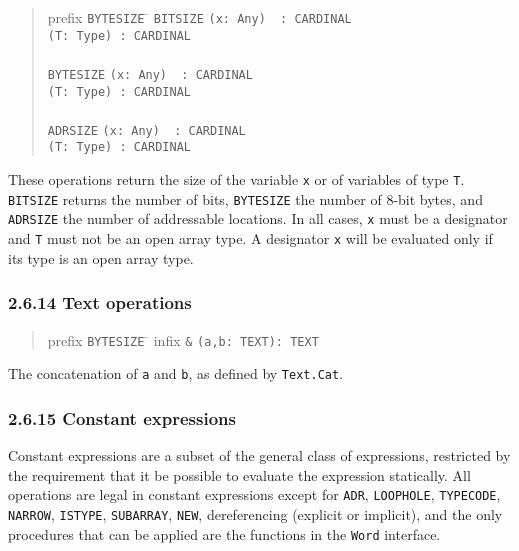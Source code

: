 \documentclass[10pt]{article}
\begin{document}
\begin{quote}
  \begin{tabbing}
    prefix \= \verb|BYTESIZE| \= \kill
    \> \verb|BITSIZE|  \> \verb|(x: Any)  : CARDINAL| \\
    \>                 \> \verb|(T: Type) : CARDINAL| \\
    \\
    \> \verb|BYTESIZE| \> \verb|(x: Any)  : CARDINAL| \\
    \>                 \> \verb|(T: Type) : CARDINAL| \\
    \\
    \> \verb|ADRSIZE|  \> \verb|(x: Any)  : CARDINAL| \\
    \>                 \> \verb|(T: Type) : CARDINAL|
  \end{tabbing}
\end{quote}
These operations return the size of the variable \verb|x| or of variables of
type \verb|T|.  \verb|BITSIZE| returns the number of bits, \verb|BYTESIZE| the
number of 8-bit bytes, and \verb|ADRSIZE| the number of addressable locations.
In all cases, \verb|x| must be a designator and \verb|T| must not be an open
array type.  A designator \verb|x| will be evaluated only if its type is an
open array type.

\subsubsection*{2.6.14 Text operations}

\begin{quote}
  \begin{tabbing}
    prefix \= \verb|BYTESIZE| \= \kill
    infix  \> \verb|&| \> \verb|(a,b: TEXT): TEXT|
  \end{tabbing}
\end{quote}
The concatenation of \verb|a| and \verb|b|, as defined by \verb|Text.Cat|.

\subsubsection*{2.6.15 Constant expressions}

Constant expressions are a subset of the general class of expressions,
restricted by the requirement that it be possible to evaluate the expression
statically.  All operations are legal in constant expressions except for
\verb|ADR|, \verb|LOOPHOLE|, \verb|TYPECODE|, \verb|NARROW|, \verb|ISTYPE|,
\verb|SUBARRAY|, \verb|NEW|, dereferencing (explicit or implicit), and the
only procedures that can be applied are the functions in the \verb|Word|
interface.
\end{document}
